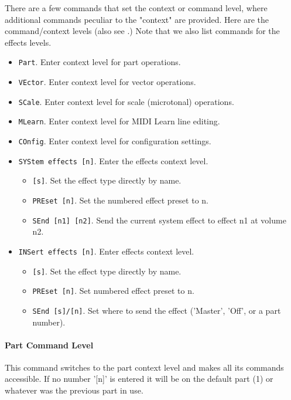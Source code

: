    There are a few commands that set the context or command level, where
   additional commands peculiar to the "context" are provided.  Here are the
   command/context levels
   (also see .)
   Note that we also list commands for the effects levels.

   \begin{itemize}
      \item \texttt{Part}. Enter context level for part operations.
      \item \texttt{VEctor}. Enter context level for vector operations.
      \item \texttt{SCale}. Enter context level for scale (microtonal) operations.
      \item \texttt{MLearn}. Enter context level for MIDI Learn line editing.
      \item \texttt{COnfig}. Enter context level for configuration settings.
      \item \texttt{SYStem effects [n]}. Enter the effects context level.
      \begin{itemize}
         \item \texttt{[s]}.  Set the effect type directly by name.
         \item \texttt{PREset [n]}. Set the numbered effect preset to n.
         \item \texttt{SEnd [n1] [n2]}. Send the current system effect to effect n1
            at volume n2.
      \end{itemize}
      \item \texttt{INSert effects [n]}. Enter effects context level.
      \begin{itemize}
         \item \texttt{[s]}. Set the effect type directly by name.
         \item \texttt{PREset [n]}. Set numbered effect preset to n.
         \item \texttt{SEnd [s]/[n]}. Set where to send the effect
            ('Master', 'Off', or a part number).
      \end{itemize}
   \end{itemize}

\paragraph{Part Command Level}
\label{paragraph:command_line_context_level_part}

   This command switches to the part context level and makes all its commands
   accessible.  If no number '[n]' is entered it will be on the default part
   (1) or whatever was the previous part in use.

